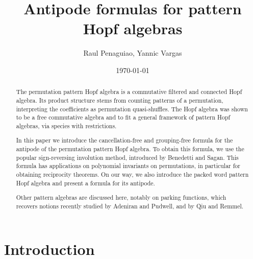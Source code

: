 \documentclass[12pt, reqno]{amsart}
\theoremstyle{definition}
\begin{document}
\title{Antipode formulas for pattern Hopf algebras} %



\author{Raul Penaguiao, Yannic Vargas}
\address{Max Planck Institute for Mathematics in Sciences, Leipzig}
\address{Technische Universit\"at Graz}
\date{\today} %

\begin{abstract}
The permutation pattern Hopf algebra is a commutative filtered and connected Hopf algebra.
Its product structure stems from counting patterns of a permutation, interpreting the coefficients as permutation quasi-shuffles.
The Hopf algebra was shown to be a free commutative algebra and to fit a general framework of pattern Hopf algebras, via species with restrictions.

In this paper we introduce the cancellation-free and grouping-free formula for the antipode of the permutation pattern Hopf algebra.
To obtain this formula, we use the popular sign-reversing involution method, introduced by Benedetti and Sagan.
This formula has applications on polynomial invariants on permutations, in particular for obtaining reciprocity theorems.
On our way, we also introduce the packed word pattern Hopf algebra and present a formula for its antipode.

Other pattern algebras are discussed here, notably on parking functions, which recovers notions recently studied by Adeniran and Pudwell, and by Qiu and Remmel.
\end{abstract}


\maketitle

\tableofcontents

\section{Introduction}
\end{document}
